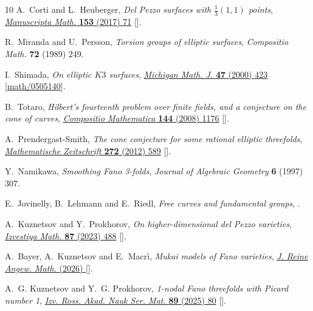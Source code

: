 \documentclass[11pt]{amsart}
\theoremstyle{definition}
\theoremstyle{definition}
\theoremstyle{remark}
\theoremstyle{remark}
\theoremstyle{definition}
\theoremstyle{conjecture}
\begin{document}
\begin{thebibliography}{10}
A.~Corti and L.~Heuberger, \emph{Del {P}ezzo surfaces with {$\frac{1}{3}(1,1)$}
  points}, \href{https://doi.org/10.1007/s00229-016-0870-y}{\emph{Manuscripta
  Math.} {\bfseries 153} (2017) 71}
  [\href{https://arxiv.org/abs/1505.02092}{{}}].

R.~Miranda and U.~Persson, \emph{Torsion groups of elliptic surfaces},
  {\emph{Compositio Math.} {\bfseries 72} (1989) 249}.

I.~Shimada, \emph{On elliptic {$K3$} surfaces},
  \href{https://doi.org/10.1307/mmj/1030132587}{\emph{Michigan Math. J.}
  {\bfseries 47} (2000) 423}
  [\href{https://arxiv.org/abs/math/0505140}{{\ttfamily math/0505140}}].

B.~Totaro, \emph{Hilbert's fourteenth problem over finite fields, and a
  conjecture on the cone of curves},
  \href{https://doi.org/10.1112/S0010437X08003667}{\emph{Compositio
  Mathematica} {\bfseries 144} (2008) 1176}
  [\href{https://arxiv.org/abs/0808.0695}{{}}].

A.~Prendergast-Smith, \emph{The cone conjecture for some rational elliptic
  threefolds},
  \href{https://doi.org/10.1007/s00209-011-0951-2}{\emph{Mathematische
  Zeitschrift} {\bfseries 272} (2012) 589}
  [\href{https://arxiv.org/abs/0910.5888}{{}}].

Y.~Namikawa, \emph{Smoothing {F}ano 3-folds}, {\emph{Journal of Algebraic
  Geometry} {\bfseries 6} (1997) 307}.

E.~Jovinelly, B.~Lehmann and E.~Riedl, \emph{Free curves and fundamental
  groups},  \href{https://arxiv.org/abs/2510.27031}{{}}.

A.~Kuznetsov and Y.~Prokhorov, \emph{On higher-dimensional del {P}ezzo
  varieties}, \href{https://doi.org/10.4213/im9385}{\emph{Izvestiya Math.}
  {\bfseries 87} (2023) 488}
  [\href{https://arxiv.org/abs/2206.01549}{{}}].

A.~Bayer, A.~Kuznetsov and E.~Macr\`i, \emph{Mukai models of {F}ano varieties},
  \href{https://doi.org/10.1515/crelle-2026-0024}{\emph{J. Reine Angew. Math.}
  (2026) } [\href{https://arxiv.org/abs/2501.16157}{{}}].

A.~G. Kuznetsov and Y.~G. Prokhorov, \emph{1-nodal {F}ano threefolds with
  {P}icard number 1}, \href{https://doi.org/10.4213/im9585}{\emph{Izv. Ross.
  Akad. Nauk Ser. Mat.} {\bfseries 89} (2025) 80}
  [\href{https://arxiv.org/abs/2312.13782}{{}}].


\end{thebibliography}
\end{document}

